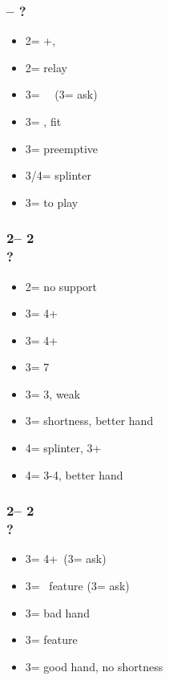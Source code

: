 \documentclass[12pt, a4paper]{report}
\begin{document}
{{        \subsubsection*{\alrts{2\hearts} -- ?}
        \begin{itemize}
            \item 2\spades = +, \fton{3\hearts}
            \item 2\nt = relay
            \item 3\clubs = \minor\ \gf\ (3\diams = ask)
            \item 3\diams = \invp, \hearts fit
            \item 3\hearts = preemptive
            \item 3\spades/4\minor = splinter
            \item 3\nt = to play
        \end{itemize}

        \subsubsection*{2\hearts -- 2\spades\\
                        ?}
        \begin{itemize}
            \item 2\nt = no \spades support
            \item 3\clubs = 4+
            \item 3\diams = 4+
            \item 3\hearts = 7\hearts
            \item 3\spades = 3\spades, weak
            \item 3\nt = \spades shortness, better hand
            \item 4\minor = splinter, 3+\spades
            \item 4\spades = 3-4\spades, better hand
        \end{itemize}

        \subsubsection*{2\hearts -- 2\nt\\
                        ?}
        \begin{itemize}
            \item 3\clubs = 4+\minor\ (3\diams = ask)
            \item 3\diams = \minor\ feature (3\hearts = ask)
            \item 3\hearts = bad hand
            \item 3\spades = \spades feature
            \item 3\nt = good hand, no shortness
        \end{itemize}

}}
\end{document}
